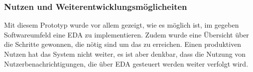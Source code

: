 \subsubsection*{Nutzen und Weiterentwicklungsmöglicheiten}
Mit diesem Prototyp wurde vor allem gezeigt, wie es möglich ist, im gegeben Softwareumfeld eine \ac{EDA} zu implementieren. Zudem wurde eine Übersicht über die Schritte gewonnen, die nötig sind um das zu erreichen. 
Einen produktiven Nutzen hat das System nicht weiter, es ist aber denkbar, dass die Nutzung von Nutzerbenachrichtigungen, die über \ac{EDA} gesteuert werden weiter verfolgt wird.\\